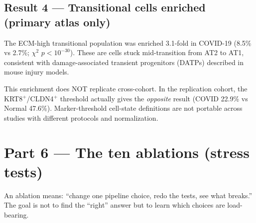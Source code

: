 \documentclass[11pt]{article}
\begin{document}
\subsection{Result 4 --- Transitional cells enriched (primary atlas only)}

The ECM-high transitional population was enriched 3.1-fold in COVID-19 (8.5\% vs 2.7\%; $\chi^2$ $p < 10^{-30}$). These are cells stuck mid-transition from AT2 to AT1, consistent with damage-associated transient progenitors (DATPs) described in mouse injury models.

\begin{pitfall}
This enrichment does NOT replicate cross-cohort. In the replication cohort, the KRT8$^+$/CLDN4$^+$ threshold actually gives the \emph{opposite} result (COVID 22.9\% vs Normal 47.6\%). Marker-threshold cell-state definitions are not portable across studies with different protocols and normalization.
\end{pitfall}


\section{Part 6 --- The ten ablations (stress tests)}

An ablation means: ``change one pipeline choice, redo the tests, see what breaks.'' The goal is not to find the ``right'' answer but to learn which choices are load-bearing.
\end{document}
